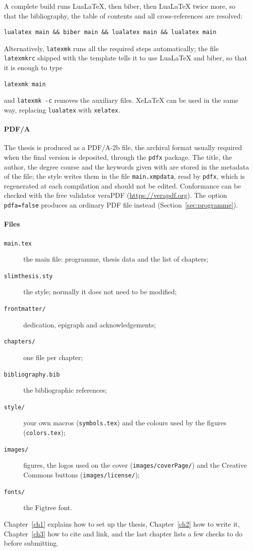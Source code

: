 A complete build runs LuaLaTeX, then biber, then LuaLaTeX twice more, so
that the bibliography, the table of contents and all cross-references are
resolved:
\begin{Verbatim}
lualatex main && biber main && lualatex main && lualatex main
\end{Verbatim}
Alternatively, \texttt{latexmk} runs all the required steps automatically;
the file \texttt{latexmkrc} shipped with the template tells it to use
LuaLaTeX and biber, so that it is enough to type
\begin{Verbatim}
latexmk main
\end{Verbatim}
and \verb|latexmk -c| removes the auxiliary files. XeLaTeX can be used in
the same way, replacing \texttt{lualatex} with \texttt{xelatex}.

\paragraph{PDF/A}

The thesis is produced as a PDF/A-2b file, the archival format usually
required when the final version is deposited, through the \texttt{pdfx}
package. The title, the author, the degree course and the keywords given
with  are stored in the metadata of the file; the style writes
them in the file \texttt{main.xmpdata}, read by \texttt{pdfx}, which is
regenerated at each compilation and should not be edited. Conformance can be
checked with the free validator veraPDF (\url{https://verapdf.org}). The
option \texttt{pdfa=false} produces an ordinary PDF file instead
(Section~\ref{sec:programme}).

\paragraph{Files}

\begin{description}
  \item[\texttt{main.tex}] the main file: programme, thesis data and the list
    of chapters;
  \item[\texttt{slimthesis.sty}] the style; normally it does not need to be
    modified;
  \item[\texttt{frontmatter/}] dedication, epigraph and acknowledgements;
  \item[\texttt{chapters/}] one file per chapter;
  \item[\texttt{bibliography.bib}] the bibliographic references;
  \item[\texttt{style/}] your own macros (\texttt{symbols.tex}) and the
    colours used by the figures (\texttt{colors.tex});
  \item[\texttt{images/}] figures, the logos used on the cover
    (\texttt{images/coverPage/}) and the Creative Commons buttons
    (\texttt{images/license/});
  \item[\texttt{fonts/}] the Figtree font.
\end{description}

Chapter~\ref{ch1} explains how to set up the thesis, Chapter~\ref{ch2} how
to write it, Chapter~\ref{ch3} how to cite and link, and the last chapter
lists a few checks to do before submitting.
